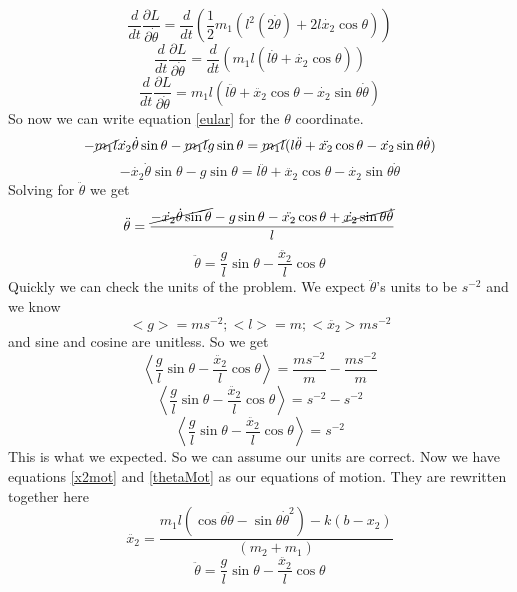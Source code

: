 \documentclass[11pt]{article}
\numberwithin{equation}{section}
\begin{document}
\begin{enumerate}[(a)]
$$\frac{d}{dt}\frac{\partial L}{\partial \dot{\theta}} = \frac{d}{dt}\left(\frac{1}{2}m_1(l^2(2\dot{\theta}) + 2l\dot{x_2}\cos{\theta})\right)$$
$$\frac{d}{dt}\frac{\partial L}{\partial \dot{\theta}} = \frac{d}{dt}\left(m_1l(l\dot{\theta} + \dot{x_2}\cos{\theta})\right)$$
$$\frac{d}{dt}\frac{\partial L}{\partial \dot{\theta}} = m_1l(l\ddot{\theta} + \ddot{x_2}\cos{\theta}-\dot{x_2}\sin{\theta}\dot{\theta})$$
So now we can write equation \ref{eular} for the $\theta$ coordinate.
$$ -\cancel{m_1l}\dot{x_2}\dot{\theta}\sin{\theta} - \cancel{m_1l}g\sin{\theta} = \cancel{m_1l}(l\ddot{\theta} + \ddot{x_2}\cos{\theta}-\dot{x_2}\sin{\theta}\dot{\theta})$$
$$ -\dot{x_2}\dot{\theta}\sin{\theta} - g\sin{\theta} = l\ddot{\theta} + \ddot{x_2}\cos{\theta}-\dot{x_2}\sin{\theta}\dot{\theta}$$
Solving for $\ddot{\theta}$ we get
$$\ddot{\theta} = \frac{\cancel{-\dot{x_2}\dot{\theta}\sin{\theta}} - g\sin{\theta} - \ddot{x_2}\cos{\theta} + \cancel{\dot{x_2}\sin{\theta}\dot{\theta}}}{l}$$
\begin{equation}
\ddot{\theta} = \frac{g}{l}\sin{\theta} - \frac{\ddot{x_2}}{l}\cos{\theta}
\label{thetaMot}
\end{equation}
Quickly we can check the units of the problem. We expect $\ddot{\theta}$'s units to be $s^{-2}$ and we know
$$<g> = m s^{-2}; <l> = m; <\ddot{x_2}>m s^{-2}$$ and sine and cosine are unitless. So we get
$$\left<\frac{g}{l}\sin{\theta} - \frac{\ddot{x_2}}{l}\cos{\theta}\right> = \frac{m s^{-2}}{m} - \frac{m s^{-2}}{m}$$
$$\left<\frac{g}{l}\sin{\theta} - \frac{\ddot{x_2}}{l}\cos{\theta}\right> = s^{-2} -  s^{-2}$$
$$\left<\frac{g}{l}\sin{\theta} - \frac{\ddot{x_2}}{l}\cos{\theta}\right> = s^{-2}$$
This is what we expected. So we can assume our units are correct.
Now we have equations \ref{x2mot} and \ref{thetaMot} as our equations of motion. They are rewritten together here
$$\ddot{x_2} = \frac{m_1l(\cos{\theta}\ddot{\theta} - \sin{\theta}\dot{\theta}^2) - k(b-x_2)}{(m_2 + m_1)}$$
$$\ddot{\theta} = \frac{g}{l}\sin{\theta} - \frac{\ddot{x_2}}{l}\cos{\theta}$$


\end{enumerate}
\end{document}
